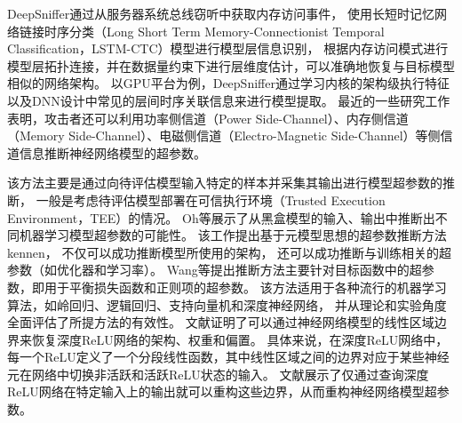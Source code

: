 DeepSniffer通过从服务器系统总线窃听中获取内存访问事件，
使用长短时记忆网络链接时序分类（Long Short Term Memory-Connectionist Temporal Classification，LSTM-CTC）模型进行模型层信息识别，
根据内存访问模式进行模型层拓扑连接，并在数据量约束下进行层维度估计，可以准确地恢复与目标模型相似的网络架构。
以GPU平台为例，DeepSniffer通过学习内核的架构级执行特征以及DNN设计中常见的层间时序关联信息来进行模型提取。
最近的一些研究工作表明，攻击者还可以利用功率侧信道（Power Side-Channel）\cite{DBLP:journals/iacr/BatinaBJP18, Zhang2021StealingNN}、内存侧信道（Memory Side-Channel）\cite{Zhang2021StealingNN, DBLP:conf/sp/RakinCYF22}、电磁侧信道（Electro-Magnetic Side-Channel）\cite{liang2022clairvoyance, yu2020deepem}等侧信道信息推断神经网络模型的超参数。 


该方法主要是通过向待评估模型输入特定的样本并采集其输出进行模型超参数的推断，
一般是考虑待评估模型部署在可信执行环境（Trusted Execution Environment，TEE）的情况。
Oh等\cite{DBLP:conf/iclr/OhAFS18}展示了从黑盒模型的输入、输出中推断出不同机器学习模型超参数的可能性。
该工作提出基于元模型思想的超参数推断方法kennen，
不仅可以成功推断模型所使用的架构，
还可以成功推断与训练相关的超参数（如优化器和学习率）。
Wang等\cite{DBLP:conf/sp/WangG18}提出推断方法主要针对目标函数中的超参数，即用于平衡损失函数和正则项的超参数。
该方法适用于各种流行的机器学习算法，如岭回归、逻辑回归、支持向量机和深度神经网络，
并从理论和实验角度全面评估了所提方法的有效性。
文献{\rm\parencite{Rolnick2019ReverseengineeringDR}}证明了可以通过神经网络模型的线性区域边界来恢复深度ReLU网络的架构、权重和偏置。
具体来说，在深度ReLU网络中，每一个ReLU定义了一个分段线性函数，其中线性区域之间的边界对应于某些神经元在网络中切换非活跃和活跃ReLU状态的输入。
文献{\rm\parencite{Rolnick2019ReverseengineeringDR}}展示了仅通过查询深度ReLU网络在特定输入上的输出就可以重构这些边界，从而重构神经网络模型超参数。 

